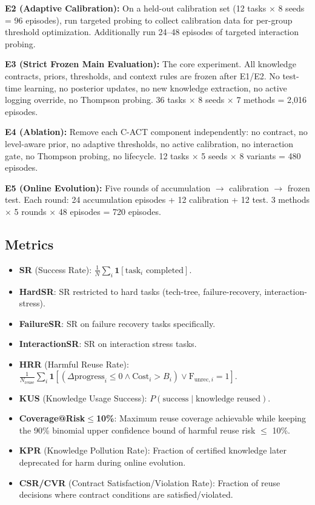 \documentclass[letterpaper]{article}
\begin{document}
\textbf{E2 (Adaptive Calibration):} On a held-out calibration set (12 tasks $\times$ 8 seeds = 96 episodes), run targeted probing to collect calibration data for per-group threshold optimization. Additionally run 24--48 episodes of targeted interaction probing.

\textbf{E3 (Strict Frozen Main Evaluation):} The core experiment. All knowledge contracts, priors, thresholds, and context rules are frozen after E1/E2. No test-time learning, no posterior updates, no new knowledge extraction, no active logging override, no Thompson probing. 36 tasks $\times$ 8 seeds $\times$ 7 methods = 2,016 episodes.

\textbf{E4 (Ablation):} Remove each \textsc{C-ACT} component independently: no contract, no level-aware prior, no adaptive thresholds, no active calibration, no interaction gate, no Thompson probing, no lifecycle. 12 tasks $\times$ 5 seeds $\times$ 8 variants = 480 episodes.

\textbf{E5 (Online Evolution):} Five rounds of accumulation $\rightarrow$ calibration $\rightarrow$ frozen test. Each round: 24 accumulation episodes + 12 calibration + 12 test. 3 methods $\times$ 5 rounds $\times$ 48 episodes = 720 episodes.

\subsection{Metrics}

\begin{itemize}
    \item \textbf{SR} (Success Rate): $\frac{1}{N}\sum_i \mathbf{1}[\text{task}_i \text{ completed}]$.
    \item \textbf{HardSR}: SR restricted to hard tasks (tech-tree, failure-recovery, interaction-stress).
    \item \textbf{FailureSR}: SR on failure recovery tasks specifically.
    \item \textbf{InteractionSR}: SR on interaction stress tasks.
    \item \textbf{HRR} (Harmful Reuse Rate): $\frac{1}{N_{\text{reuse}}}\sum_i \mathbf{1}[(\Delta\text{progress}_i \le 0 \land \text{Cost}_i > B_i) \lor \text{F}_{\text{unrec},i}=1]$.
    \item \textbf{KUS} (Knowledge Usage Success): $P(\text{success} \mid \text{knowledge reused})$.
    \item \textbf{Coverage@Risk$\le$10\%}: Maximum reuse coverage achievable while keeping the 90\% binomial upper confidence bound of harmful reuse risk $\le$ 10\%.
    \item \textbf{KPR} (Knowledge Pollution Rate): Fraction of certified knowledge later deprecated for harm during online evolution.
    \item \textbf{CSR/CVR} (Contract Satisfaction/Violation Rate): Fraction of reuse decisions where contract conditions are satisfied/violated.
\end{itemize}
\end{document}
